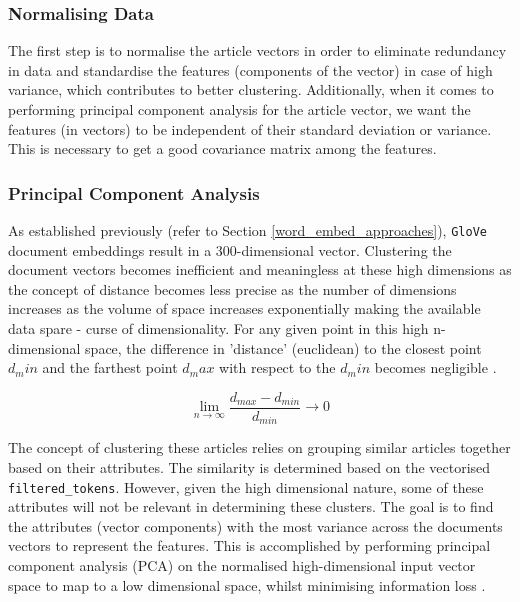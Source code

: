 \subsubsection{Normalising Data}
The first step is to normalise the article vectors in order to eliminate redundancy in data and standardise the features (components of the vector) in case of high variance, which contributes to better clustering. Additionally, when it comes to performing principal component analysis for the article vector, we want the features (in vectors) to be independent of their standard deviation or variance. This is necessary to get a good covariance matrix among the features.  

\subsubsection{Principal Component Analysis}

As established previously (refer to Section \ref{word_embed_approaches}), \texttt{GloVe} document embeddings result in a 300-dimensional vector. Clustering the document vectors becomes inefficient and meaningless at these high dimensions as the concept of distance becomes less precise as the number of dimensions increases \cite{pca_clustering} as the volume of space increases exponentially making the available data spare - curse of dimensionality. For any given point in this high n-dimensional space, the difference in 'distance' (euclidean) to the closest point $d_min$ and the farthest point $d_max$ with respect to the $d_min$ becomes negligible \cite{nearest_neighbour}. 

\[ \lim_{n\to\infty} \frac{d_{max} - d_{min}}{d_{min}} \to0\]

The concept of clustering these articles relies on grouping similar articles together based on their attributes. The similarity is determined based on the vectorised \texttt{filtered\_tokens}. However, given the high dimensional nature, some of these attributes will not be relevant in determining these clusters. The goal is to find the attributes (vector components) with the most variance across the documents vectors to represent the features. This is accomplished by performing principal component analysis (PCA) on the normalised high-dimensional input vector space to map to a low dimensional space, whilst minimising information loss \cite{pca_clustering}.

